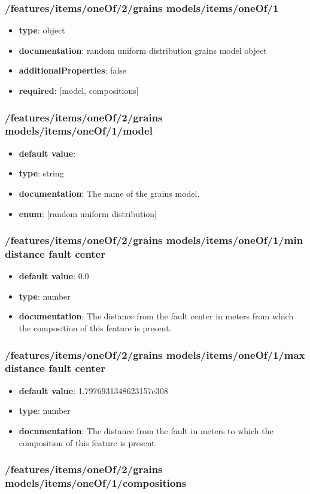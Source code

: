 \subsubsection{/features/items/oneOf/2/grains models/items/oneOf/1}
\begin{itemize}\item {\bf type}: object
\item {\bf documentation}: random uniform distribution grains model object
\item {\bf additionalProperties}: false
\item {\bf required}: [model, compositions]\end{itemize}
\subsubsection{/features/items/oneOf/2/grains models/items/oneOf/1/model}
\begin{itemize}\item {\bf default value}: 
\item {\bf type}: string
\item {\bf documentation}: The name of the grains model.
\item {\bf enum}: [random uniform distribution]\end{itemize}\subsubsection{/features/items/oneOf/2/grains models/items/oneOf/1/min distance fault center}
\begin{itemize}\item {\bf default value}: 0.0
\item {\bf type}: number
\item {\bf documentation}: The distance from the fault center in meters from which the composition of this feature is present.
\end{itemize}\subsubsection{/features/items/oneOf/2/grains models/items/oneOf/1/max distance fault center}
\begin{itemize}\item {\bf default value}: 1.7976931348623157e308
\item {\bf type}: number
\item {\bf documentation}: The distance from the fault in meters to which the composition of this feature is present.
\end{itemize}\subsubsection{/features/items/oneOf/2/grains models/items/oneOf/1/compositions}
